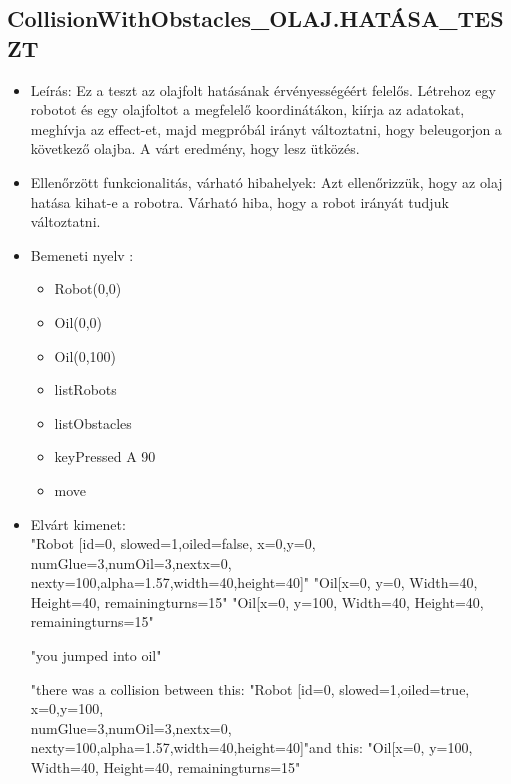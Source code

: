 \subsection{CollisionWithObstacles\_OLAJ.HATÁSA\_TESZT}
\begin{itemize}
	\item Leírás: Ez a teszt az olajfolt hatásának érvényességéért felelős. Létrehoz egy robotot és egy olajfoltot a megfelelő koordinátákon, kiírja az adatokat, meghívja az effect-et, majd megpróbál irányt változtatni, hogy beleugorjon a következő olajba. A várt eredmény, hogy lesz ütközés.
\newline
	\item  Ellenőrzött funkcionalitás, várható hibahelyek: Azt ellenőrizzük, hogy az olaj hatása kihat-e a robotra.
		   Várható hiba, hogy a robot irányát tudjuk változtatni.
	\item Bemeneti nyelv :
		\begin{itemize}
		\item Robot(0,0)
		\item Oil(0,0)
		\item Oil(0,100)
		\item listRobots
		\item listObstacles
		\item keyPressed A 90
		\item move
		\end{itemize}
	
	\item Elvárt kimenet: \\
		"Robot [id=0,  slowed=1,oiled=false, x=0,y=0, 
		\\numGlue=3,numOil=3,nextx=0,
		\\nexty=100,alpha=1.57,width=40,height=40]"\newline
		"Oil[x=0, y=0, Width=40, Height=40, remainingturns=15"\newline
			"Oil[x=0, y=100, Width=40, Height=40, remainingturns=15"\newline
			
			"you jumped into oil"\newline
		
		"there was a collision between this: "Robot [id=0,  slowed=1,oiled=true, x=0,y=100, 
		\\numGlue=3,numOil=3,nextx=0,
		\\nexty=100,alpha=1.57,width=40,height=40]"\newline and this: "Oil[x=0, y=100, Width=40, Height=40, remainingturns=15"\newline
\end{itemize}

